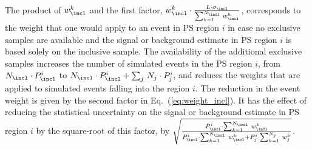 The product of $w_{\incl}^{k}$ and the first factor, $w_{\incl}^{k} \cdot \frac{L \cdot \sigma_{\incl}}{\sum_{k=1}^{N_{\incl}} \, w_{\incl}^{k}}$,
corresponds to the weight that one would apply to an event in PS region $i$ 
in case no exclusive samples are available and the signal or background estimate in PS region $i$ is based solely on the inclusive sample.
The availability of the additional exclusive samples increases the number of simulated events in the PS region $i$, 
from $N_{\incl} \cdot P_{\incl}^{i}$ to $N_{\incl} \cdot P_{\incl}^{i} + \sum_{j} \, N_{j} \cdot P_{j}^{i}$,
and reduces the weights that are applied to simulated events falling into the region $i$.
The reduction in the event weight is given by the second factor in Eq.~(\ref{eq:weight_incl}).
It has the effect of reducing the statistical uncertainty on the signal or background estimate in PS region $i$
by the square-root of this factor,
\ie by $\sqrt{\frac{P_{\incl}^{i} \cdot \sum_{k=1}^{N_{\incl}} \, w_{\incl}^{k}}{P_{\incl}^{i} \cdot \sum_{k=1}^{N_{\incl}} \, w_{\incl}^{k} + P_{j}^{i} \cdot \sum_{k=1}^{N_{j}} \, w_{j}^{k}}}$.
